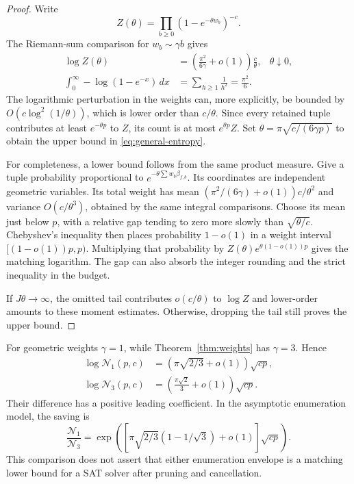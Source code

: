 \documentclass[11pt]{article}
\theoremstyle{remark}
\begin{document}
\begin{proof}
Write
\[
 Z(\theta)=\prod_{b\ge0}(1-e^{-\theta w_b})^{-c}.
\]
The Riemann-sum comparison for $w_b\sim\gamma b$ gives
\begin{align*}
 \log Z(\theta)
 &=\left(\frac{\pi^2}{6\gamma}+o(1)\right)\frac c\theta,
 &\theta\downarrow0,\\
 \int_0^\infty-\log(1-e^{-x})\,dx
 &=\sum_{h\ge1}\frac1{h^2}=\frac{\pi^2}{6}.
\end{align*}
The logarithmic perturbation in the weights can, more explicitly, be bounded by $O(c\log^2(1/\theta))$, which is lower order than $c/\theta$. Since every retained tuple contributes at least $e^{-\theta p}$ to $Z$, its count is at most $e^{\theta p}Z$. Set $\theta=\pi\sqrt{c/(6\gamma p)}$ to obtain the upper bound in \eqref{eq:general-entropy}.

For completeness, a lower bound follows from the same product measure. Give a tuple probability proportional to $e^{-\theta\sum w_b\beta_{f,b}}$. Its coordinates are independent geometric variables. Its total weight has mean $(\pi^2/(6\gamma)+o(1))c/\theta^2$ and variance $O(c/\theta^3)$, obtained by the same integral comparisons. Choose its mean just below $p$, with a relative gap tending to zero more slowly than $\sqrt{\theta/c}$. Chebyshev's inequality then places probability $1-o(1)$ in a weight interval $[(1-o(1))p,p)$. Multiplying that probability by $Z(\theta)e^{\theta(1-o(1))p}$ gives the matching logarithm. The gap can also absorb the integer rounding and the strict inequality in the budget.

If $J\theta\to\infty$, the omitted tail contributes $o(c/\theta)$ to $\log Z$ and lower-order amounts to these moment estimates. Otherwise, dropping the tail still proves the upper bound.
\end{proof}

For geometric weights $\gamma=1$, while Theorem~\ref{thm:weights} has $\gamma=3$. Hence
\begin{align}
 \log\mathcal N_1(p,c)&=
       \left(\pi\sqrt{2/3}+o(1)\right)\sqrt{cp},\label{eq:oldentropy}\\
 \log\mathcal N_3(p,c)&=
       \left(\frac{\pi\sqrt2}{3}+o(1)\right)\sqrt{cp}.
       \label{eq:newentropy}
\end{align}
Their difference has a positive leading coefficient. In the asymptotic enumeration model, the saving is
\[
 \frac{\mathcal N_1}{\mathcal N_3}
 =\exp\left(\left[\pi\sqrt{2/3}(1-1/\sqrt3)+o(1)\right]\sqrt{cp}\right).
\]
This comparison does not assert that either enumeration envelope is a matching lower bound for a SAT solver after pruning and cancellation.
\end{document}
